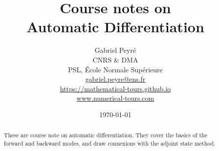 \documentclass[10pt]{article}
\title{Course notes on\\Automatic Differentiation}
\author{%
\begin{tabular}{c}
	Gabriel Peyr{\'e} \\ CNRS \& DMA \\
	 PSL, \'Ecole Normale Sup\'erieure \\
	 \url{gabriel.peyre@ens.fr}\\
	 \url{https://mathematical-tours.github.io}\\
	 \url{www.numerical-tours.com}
\end{tabular}
}
\date{\today}
\begin{document}
\maketitle

\begin{abstract}
		These are course note on automatic differentiation. They cover the basics of the forward and backward modes, and draw connexions with the adjoint state method. 
\end{abstract}

%



% 






\end{document}
